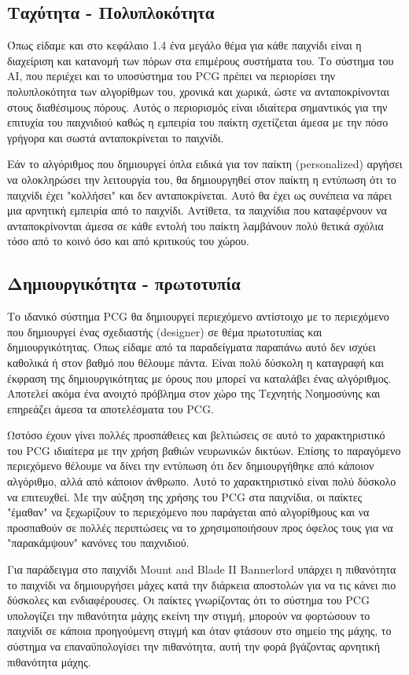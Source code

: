 \subsection{Ταχύτητα - Πολυπλοκότητα} Όπως είδαμε και στο κεφάλαιο 1.4 ένα μεγάλο θέμα για κάθε παιχνίδι είναι η διαχείριση και κατανομή των πόρων στα επιμέρους συστήματα του. Το σύστημα του AI, που περιέχει και το υποσύστημα του PCG πρέπει να περιορίσει την πολυπλοκότητα των αλγορίθμων του, χρονικά και χωρικά, ώστε να ανταποκρίνονται στους διαθέσιμους πόρους. Αυτός ο περιορισμός είναι ιδιαίτερα σημαντικός για την επιτυχία του παιχνιδιού καθώς η εμπειρία του παίκτη σχετίζεται άμεσα με την πόσο γρήγορα και σωστά ανταποκρίνεται το παιχνίδι. 
\par
Εάν το αλγόριθμος που δημιουργεί όπλα ειδικά για τον παίκτη (personalized) αργήσει να ολοκληρώσει την λειτουργία του, θα δημιουργηθεί στον παίκτη η εντύπωση ότι το παιχνίδι έχει "κολλήσει" και δεν ανταποκρίνεται. Αυτό θα έχει ως συνέπεια να πάρει μια αρνητική εμπειρία από το παιχνίδι. Αντίθετα, τα παιχνίδια που καταφέρνουν να ανταποκρίνονται άμεσα σε κάθε εντολή του παίκτη λαμβάνουν πολύ θετικά σχόλια τόσο από το κοινό όσο και από κριτικούς του χώρου.

\subsection{Δημιουργικότητα - πρωτοτυπία} Το ιδανικό σύστημα PCG θα δημιουργεί περιεχόμενο αντίστοιχο με το περιεχόμενο που δημιουργεί ένας σχεδιαστής (designer) σε θέμα πρωτοτυπίας και δημιουργικότητας. Όπως είδαμε από τα παραδείγματα παραπάνω αυτό δεν ισχύει καθολικά ή στον βαθμό που θέλουμε πάντα. Είναι πολύ δύσκολη η καταγραφή και έκφραση της δημιουργικότητας με όρους που μπορεί να καταλάβει ένας αλγόριθμος. Αποτελεί ακόμα ένα ανοιχτό πρόβλημα στον χώρο της Τεχνητής Νοημοσύνης και επηρεάζει άμεσα τα αποτελέσματα του PCG.
\par
Ωστόσο έχουν γίνει πολλές προσπάθειες και βελτιώσεις σε αυτό το χαρακτηριστικό του PCG ιδιαίτερα με την χρήση βαθιών νευρωνικών δικτύων. Επίσης το παραγόμενο περιεχόμενο θέλουμε να δίνει την εντύπωση ότι δεν δημιουργήθηκε από κάποιον αλγόριθμο, αλλά από κάποιον άνθρωπο. Αυτό το χαρακτηριστικό είναι πολύ δύσκολο να επιτευχθεί. Με την αύξηση της χρήσης του PCG στα παιχνίδια, οι παίκτες "έμαθαν" να ξεχωρίζουν το περιεχόμενο που παράγεται από αλγορίθμους και να προσπαθούν σε πολλές περιπτώσεις να το χρησιμοποιήσουν προς όφελος τους για να "παρακάμψουν" κανόνες του παιχνιδιού.
\par
Για παράδειγμα στο παιχνίδι Mount and Blade II Bannerlord \cite{bannerlord} υπάρχει η πιθανότητα το παιχνίδι να δημιουργήσει μάχες κατά την διάρκεια αποστολών για να τις κάνει πιο δύσκολες και ενδιαφέρουσες. Οι παίκτες γνωρίζοντας ότι το σύστημα του PCG υπολογίζει την πιθανότητα μάχης εκείνη την στιγμή, μπορούν να φορτώσουν το παιχνίδι σε κάποια προηγούμενη στιγμή και όταν φτάσουν στο σημείο της μάχης, το σύστημα να επαναϋπολογίσει την πιθανότητα, αυτή την φορά βγάζοντας αρνητική πιθανότητα μάχης. 

